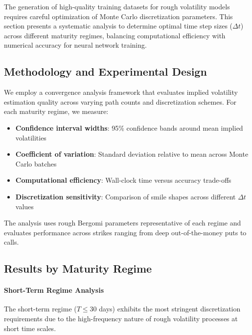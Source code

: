 	The generation of high-quality training datasets for rough volatility models requires careful optimization of Monte Carlo discretization parameters. This section presents a systematic analysis to determine optimal time step sizes ($\Delta t$) across different maturity regimes, balancing computational efficiency with numerical accuracy for neural network training.
	
	\subsection{Methodology and Experimental Design}
	
	We employ a convergence analysis framework that evaluates implied volatility estimation quality across varying path counts and discretization schemes. For each maturity regime, we measure:
	
	\begin{itemize}[nosep]
		\item \textbf{Confidence interval widths}: 95\% confidence bands around mean implied volatilities
		\item \textbf{Coefficient of variation}: Standard deviation relative to mean across Monte Carlo batches
		\item \textbf{Computational efficiency}: Wall-clock time versus accuracy trade-offs
		\item \textbf{Discretization sensitivity}: Comparison of smile shapes across different $\Delta t$ values
	\end{itemize}
	
	The analysis uses rough Bergomi parameters representative of each regime and evaluates performance across strikes ranging from deep out-of-the-money puts to calls.
	
	\subsection{Results by Maturity Regime}
	
	\paragraph{Short-Term Regime Analysis}
	
	The short-term regime ($T \leq 30$ days) exhibits the most stringent discretization requirements due to the high-frequency nature of rough volatility processes at short time scales.
	
